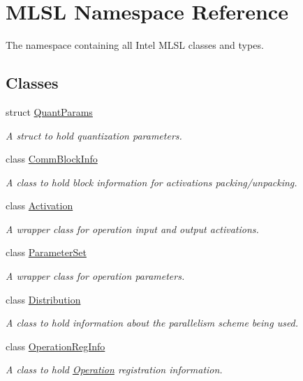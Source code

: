\hypertarget{namespaceMLSL}{\section{M\-L\-S\-L Namespace Reference}
\label{namespaceMLSL}
}


The namespace containing all Intel M\-L\-S\-L classes and types.  


\subsection*{Classes}
\begin{DoxyCompactItemize}
\item 
struct \hyperlink{structMLSL_1_1QuantParams}{Quant\-Params}
\begin{DoxyCompactList}\small\item\em A struct to hold quantization parameters. \end{DoxyCompactList}\item 
class \hyperlink{classMLSL_1_1CommBlockInfo}{Comm\-Block\-Info}
\begin{DoxyCompactList}\small\item\em A class to hold block information for activations packing/unpacking. \end{DoxyCompactList}\item 
class \hyperlink{classMLSL_1_1Activation}{Activation}
\begin{DoxyCompactList}\small\item\em A wrapper class for operation input and output activations. \end{DoxyCompactList}\item 
class \hyperlink{classMLSL_1_1ParameterSet}{Parameter\-Set}
\begin{DoxyCompactList}\small\item\em A wrapper class for operation parameters. \end{DoxyCompactList}\item 
class \hyperlink{classMLSL_1_1Distribution}{Distribution}
\begin{DoxyCompactList}\small\item\em A class to hold information about the parallelism scheme being used. \end{DoxyCompactList}\item 
class \hyperlink{classMLSL_1_1OperationRegInfo}{Operation\-Reg\-Info}
\begin{DoxyCompactList}\small\item\em A class to hold \hyperlink{classMLSL_1_1Operation}{Operation} registration information. \end{DoxyCompactList}\item 

\end{DoxyCompactItemize}
